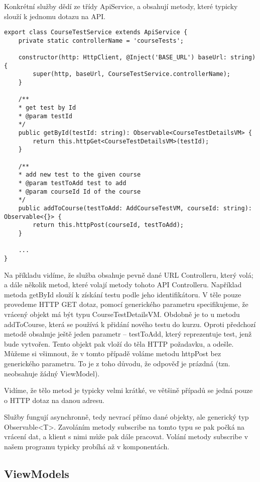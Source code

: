 Konkrétní služby dědí ze třídy ApiService, a obsahují metody, které typicky slouží k jednomu dotazu na API.

\begin{lstlisting}
export class CourseTestService extends ApiService {
	private static controllerName = 'courseTests';
	
	constructor(http: HttpClient, @Inject('BASE_URL') baseUrl: string) {
		super(http, baseUrl, CourseTestService.controllerName);
	}
	
	/**
	* get test by Id
	* @param testId
	*/
	public getById(testId: string): Observable<CourseTestDetailsVM> {
		return this.httpGet<CourseTestDetailsVM>(testId);
	}
	
	/**
	* add new test to the given course
	* @param testToAdd test to add
	* @param courseId Id of the course
	*/
	public addToCourse(testToAdd: AddCourseTestVM, courseId: string): Observable<{}> {
		return this.httpPost(courseId, testToAdd);
	}
	
	...
}
\end{lstlisting}

Na příkladu vidíme, že služba obsahuje pevně dané URL Controlleru, který volá; a dále několik metod, které volají metody tohoto API Controlleru.
Například metoda getById slouží k získání testu podle jeho identifikátoru. V těle pouze provedeme HTTP GET dotaz, pomocí generického parametru specifikujeme, že vrácený objekt má být typu CourseTestDetailsVM. 
Obdobně je to u metodu addToCourse, která se používá k přidání nového testu do kurzu. Oproti předchozí metodě obsahuje ještě jeden parametr -- testToAdd, který reprezentuje test, jenž bude vytvořen. Tento objekt pak vloží do těla HTTP požadavku, a odešle. 
Můžeme si všimnout, že v tomto případě voláme metodu httpPost bez generického parametru. To je z toho důvodu, že odpověď je prázdná (tzn. neobsahuje žádný ViewModel).

Vidíme, že tělo metod je typicky velmi krátké, ve většině případů se jedná pouze o HTTP dotaz na danou adresu.

Služby fungují asynchronně, tedy nevrací přímo dané objekty, ale generický typ Observable<T>. Zavoláním metody subscribe na tomto typu se pak počká na vrácení dat, a klient s nimi může pak dále pracovat.
Volání metody subscribe v našem programu typicky probíhá až v komponentách.

\newpage

\subsection{ViewModels}
\label{clientVM}

